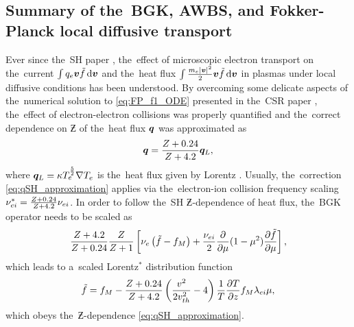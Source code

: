 
\subsection{Summary of the~BGK, AWBS, and Fokker-Planck local diffusive 
transport}
\label{app:SummaryDiffusiveKinetics}

Ever since the~SH paper \cite{SpitzerHarm_PR1953}, the~effect of microscopic
electron transport on the~current $\int q_e \boldsymbol{v} \tilde{f} \, \text{d}\boldsymbol{v}$ 
and the~heat flux $\int \frac{m_e |\boldsymbol{v}|^2}{2} \boldsymbol{v} \tilde{f} \, \text{d}\boldsymbol{v}$ 
in plasmas
under local diffusive conditions has been understood. By overcoming some 
delicate aspects of the~numerical solution to \eqref{eq:FP_f1_ODE} presented 
in the~CSR paper \cite{CSR_1950}, the~effect of electron-electron collisions
was properly quantified and the~correct dependence on $\Zbar$ of the~heat flux
$\boldsymbol{q}$ was approximated as \cite{Epperlein_PoFB1991} 
\begin{equation}
  \boldsymbol{q} = \frac{Z + 0.24}{Z + 4.2} \boldsymbol{q}_L ,
  \label{app_eq:qSH_approximation}
\end{equation}
where $\boldsymbol{q}_L = \kappa T_e^{\frac{5}{2}}\nabla T_e$ is the~heat flux given 
by Lorentz \cite{Lorentz_1905}. Usually, the~correction 
\eqref{eq:qSH_approximation} applies via the~electron-ion collision frequency
scaling $\nu_{ei}^* = \frac{Z + 0.24}{Z + 4.2} \nu_{ei}$.
In order to follow the~SH $\Zbar$-dependence of heat flux, the~BGK operator 
needs to be scaled as
\begin{equation}
  \frac{Z + 4.2}{Z + 0.24}
  \frac{Z}{Z+1}\left[\nu_{e}\left(\tilde{f} - f_M\right)
  + \frac{\nu_{ei}}{2}
  \frac{\partial{}}{\partial{\mu}}(1 - \mu^2)\frac{\partial{\tilde{f}}}{\partial{\mu}}\right] ,
  \nonumber
\end{equation}
which leads to a~scaled Lorentz$^*$ distribution function
\begin{equation}
  \tilde{f} = f_M - \frac{Z+0.24}{Z+4.2}
  \left( \frac{v^2}{2 v_{th}^2} - 4\right)
  \frac{1}{T}\frac{\partial{T}}{\partial{z}}f_M \lambda_{ei} \mu ,
  \label{app_eq:Scaled_Lorentz}
\end{equation}
which obeys the~$\Zbar$-dependence \eqref{eq:qSH_approximation}.

